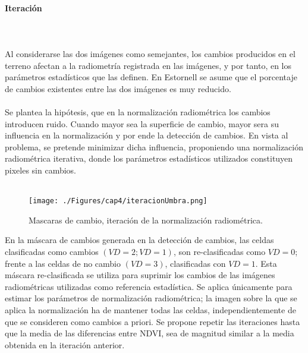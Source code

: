 \paragraph{Iteraci\'on}\label{subsec:iteracion}\mbox{}\\\mbox{}\\
Al considerarse las dos im\'agenes como semejantes, los cambios producidos en el terreno afectan a la radiometría registrada en las imágenes, y por tanto, en los parámetros estadísticos que las definen. En Estornell\cite{estornell2004analisis} se asume que el porcentaje de cambios existentes entre las dos im\'agenes es muy reducido.\\~\\
Se plantea la hip\'otesis, que en la normalizaci\'on radiom\'etrica los cambios introducen ruido. Cuando mayor sea la superficie de cambio, mayor sera su influencia en la normalizaci\'on y por ende la detecci\'on de cambios. En vista al problema, se pretende minimizar dicha influencia, proponiendo una normalizaci\'on radiom\'etrica iterativa, donde los par\'ametros estad\'isticos utilizados constituyen pixeles sin cambios. \\~\\
	\begin{figure}[H]
		\centering
		\texttt{[image: ./Figures/cap4/iteracionUmbra.png]}
		\caption{Mascaras de cambio, iteraci\'on de la normalizaci\'on radiom\'etrica.}
		\label{fig:umbrales}
	\end{figure}
En la máscara de cambios generada en la detección de cambios, las celdas clasificadas como cambios $ (VD = 2; VD = 1) $, son re-clasificadas como $ VD=0 $; frente a las celdas de no cambio $(VD = 3)  $, clasificadas con $ VD=1 $. Esta máscara re-clasificada se utiliza para suprimir los cambios de las im\'agenes radiom\'etricas utilizadas como referencia estad\'istica. Se aplica \'unicamente para estimar los par\'ametros de normalizaci\'on radiom\'etrica; la imagen sobre la que se aplica la normalizaci\'on ha de mantener todas las
celdas, independientemente de que se consideren como cambios a priori. Se propone repetir las iteraciones hasta que la media de las diferencias entre NDVI, sea de magnitud similar a la media obtenida en la iteraci\'on anterior. 
